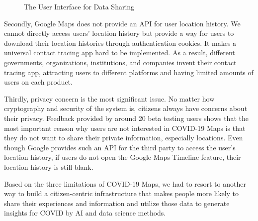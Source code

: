 \documentclass{ucsdreport}
\begin{document}
\begin{figure}[H]
    \centering
    \caption{The User Interface for Data Sharing}
\end{figure}

Secondly, Google Maps does not provide an API for user location history. We 
cannot directly access users' location history but provide a way for users to 
download their location histories through authentication cookies. It makes a 
universal contact tracing app hard to be implemented. As a result, different 
governments, organizations, institutions, and companies invent their contact 
tracing app, attracting users to different platforms and having limited 
amounts of users on each product. 

Thirdly, privacy concern is the most significant issue. No matter how 
cryptography and security of the system is, citizens always have concerns
about their privacy. Feedback provided by around 20 beta testing users shows 
that the most important reason why users are not interested in COVID-19 Maps is
that they do not want to share their private information, especially locations. 
Even though Google provides such an API for the third party to access the user's
location history, if users do not open the Google Maps Timeline feature, their
location history is still blank. 

Based on the three limitations of COVID-19 Maps, we had to resort to another 
way to build a citizen-centric infrastructure that makes people more likely to 
share their experiences and information and utilize those data to generate 
insights for COVID by AI and data science methods. 
\end{document}
